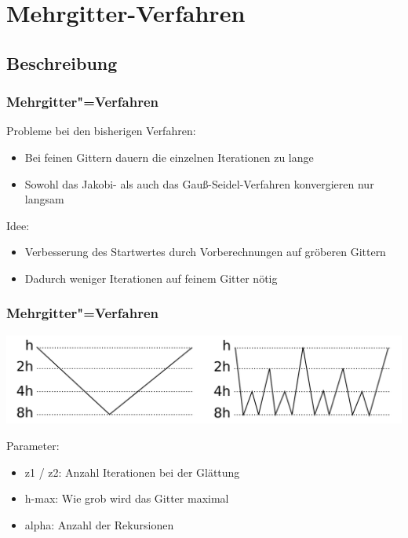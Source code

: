 \documentclass{beamer}
\begin{document}
\section{Mehrgitter-Verfahren}
\subsection{Beschreibung}
\begin{frame}
    \frametitle{Mehrgitter"=Verfahren}
    Probleme bei den bisherigen Verfahren:
    \begin{itemize}
        \item Bei feinen Gittern dauern die einzelnen Iterationen zu lange
        \item Sowohl das Jakobi- als auch das Gauß-Seidel-Verfahren konvergieren nur langsam
    \end{itemize}
    Idee:
    \begin{itemize}
        \item Verbesserung des Startwertes durch Vorberechnungen auf gröberen Gittern
        \item Dadurch weniger Iterationen auf feinem Gitter nötig
    \end{itemize}
\end{frame}

\begin{frame}
    \frametitle{Mehrgitter"=Verfahren}
    \includegraphics[width=\textwidth]{valgorithmus}

    Parameter:
    \begin{itemize}
        \item z1 / z2: Anzahl Iterationen bei der Glättung
        \item h-max: Wie grob wird das Gitter maximal
        \item alpha: Anzahl der Rekursionen
    \end{itemize}
\end{frame}
\end{document}
